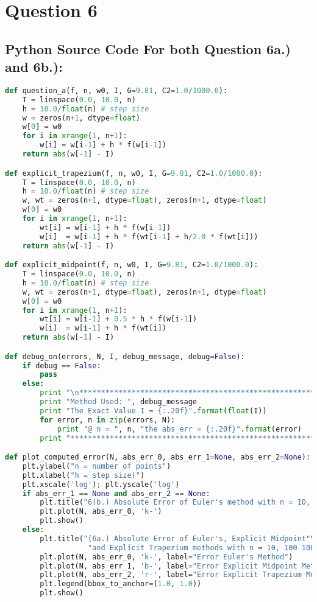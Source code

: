 \documentclass{article}
\begin{document}
\pagebreak

\section*{Question 6}
\subsection*{Python Source Code For both Question 6a.) and 6b.): }
\begin{lstlisting}[language=Python]
def question_a(f, n, w0, I, G=9.81, C2=1.0/1000.0):
    T = linspace(0.0, 10.0, n)
    h = 10.0/float(n) # step size
    w = zeros(n+1, dtype=float)
    w[0] = w0
    for i in xrange(1, n+1):
        w[i] = w[i-1] + h * f(w[i-1])
    return abs(w[-1] - I)

def explicit_trapezium(f, n, w0, I, G=9.81, C2=1.0/1000.0):
    T = linspace(0.0, 10.0, n)
    h = 10.0/float(n) # step size
    w, wt = zeros(n+1, dtype=float), zeros(n+1, dtype=float)
    w[0] = w0
    for i in xrange(1, n+1):
        wt[i] = w[i-1] + h * f(w[i-1])
        w[i]  = w[i-1] + h * f(wt[i-1] + h/2.0 * f(wt[i]))
    return abs(w[-1] - I)

def explicit_midpoint(f, n, w0, I, G=9.81, C2=1.0/1000.0):
    T = linspace(0.0, 10.0, n)
    h = 10.0/float(n) # step size
    w, wt = zeros(n+1, dtype=float), zeros(n+1, dtype=float)
    w[0] = w0
    for i in xrange(1, n+1):
        wt[i] = w[i-1] + 0.5 * h * f(w[i-1])
        w[i]  = w[i-1] + h * f(wt[i])
    return abs(w[-1] - I)

def debug_on(errors, N, I, debug_message, debug=False):
    if debug == False:
        pass
    else:
        print "\n************************************************************"
        print "Method Used: ", debug_message
        print "The Exact Value I = {:.20f}".format(float(I))
        for error, n in zip(errors, N):
            print "@ n = ", n, "the abs_err = {:.20f}".format(error)
        print "************************************************************"

def plot_computed_error(N, abs_err_0, abs_err_1=None, abs_err_2=None):
    plt.ylabel("n = number of points")
    plt.xlabel("h = step size)")
    plt.xscale('log'); plt.yscale('log')
    if abs_err_1 == None and abs_err_2 == None:
        plt.title("6(b.) Absolute Error of Euler's method with n = 10, 100 1000")
        plt.plot(N, abs_err_0, 'k-')
        plt.show()
    else:
        plt.title("(6a.) Absolute Error of Euler's, Explicit Midpoint"\
                   "and Explicit Trapezium methods with n = 10, 100 1000")
        plt.plot(N, abs_err_0, 'k-', label="Error Euler's Method")
        plt.plot(N, abs_err_1, 'b-', label="Error Explicit Midpoint Method")
        plt.plot(N, abs_err_2, 'r-', label="Error Explicit Trapezium Method")
        plt.legend(bbox_to_anchor=(1.0, 1.0))
        plt.show()


\end{lstlisting}
\end{document}
